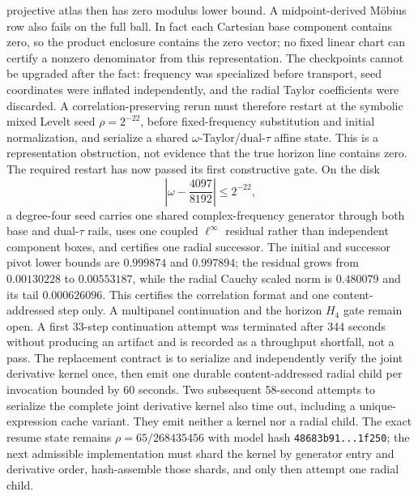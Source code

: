 \documentclass[11pt]{article}
\theoremstyle{definition}
\theoremstyle{remark}
\begin{document}
projective atlas then has zero modulus lower bound.  A midpoint-derived
M\"obius row also fails on the full ball.  In fact each Cartesian base
component contains zero, so the product enclosure contains the zero vector;
no fixed linear chart can certify a nonzero denominator from this
representation.  The checkpoints cannot be upgraded after the fact:
frequency was specialized before transport, seed coordinates were inflated
independently, and the radial Taylor coefficients were discarded.  A
correlation-preserving rerun must therefore restart at the symbolic mixed
Levelt seed \(\rho=2^{-22}\), before fixed-frequency substitution and
initial normalization, and serialize a shared \(\omega\)-Taylor/dual-\(\tau\)
affine state.  This is a representation obstruction, not evidence that the
true horizon line contains zero.  The required restart has now passed its
first constructive gate.  On the disk
\[
 \left|\omega-\frac{4097}{8192}\right|\le 2^{-22},
\]
a degree-four seed carries one shared complex-frequency generator through
both base and dual-\(\tau\) rails, uses one coupled
\(\ell^\infty\) residual rather than independent component boxes, and
certifies one radial successor.  The initial and successor pivot lower
bounds are \(0.999874\) and \(0.997894\); the residual grows from
\(0.00130228\) to \(0.00553187\), while the radial Cauchy scaled norm is
\(0.480079\) and its tail \(0.000626096\).  This certifies the correlation
format and one content-addressed step only.  A multipanel continuation and
the horizon \(H_4\) gate remain open.  A first 33-step continuation attempt
was terminated after 344 seconds without producing an artifact and is
recorded as a throughput shortfall, not a pass.  The replacement contract is
to serialize and independently verify the joint derivative kernel once,
then emit one durable content-addressed radial child per invocation bounded
by 60 seconds.
Two subsequent 58-second attempts to serialize the complete joint
derivative kernel also time out, including a unique-expression cache
variant.  They emit neither a kernel nor a radial child.  The exact resume
state remains
\(\rho=65/268435456\) with model hash
\texttt{48683b91...1f250}; the next admissible implementation must shard the
kernel by generator entry and derivative order, hash-assemble those shards,
and only then attempt one radial child.
\end{document}
